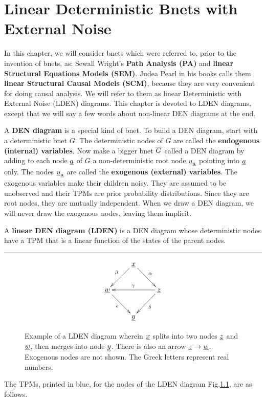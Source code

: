 \chapter{Linear Deterministic Bnets 
with External 
Noise}\label{ch-linear-sys}

In this chapter, we will consider 
bnets which were referred to,
prior to the invention of bnets, as:
Sewall Wright's {\bf Path Analysis (PA)}
 and
{\bf linear Structural Equations Models (SEM)}.
Judea Pearl in his
books calls them
{\bf linear Structural Causal Models (SCM)},
because they are very 
convenient for doing causal analysis.
We will refer  to
them as linear  Deterministic with 
External Noise
 (LDEN) diagrams.
This chapter
is devoted to LDEN diagrams,
except that we will
say a few words
about non-linear DEN
diagrams at the end.


A {\bf DEN diagram}
is a special kind of bnet.
To 
build a DEN diagram,
start with a 
deterministic bnet $G$.
The deterministic
nodes of $G$ are called
the {\bf endogenous (internal) variables}.
Now make a bigger bnet $\overline{G}$
called a DEN diagram
by 
adding to each node ${\underline{a}}$ of $G$ a
non-deterministic  
root node ${\underline{u}}_{\underline{a}}$
pointing into ${\underline{a}}$ only.
The nodes ${\underline{u}}_{\underline{a}}$ are called
the {\bf exogenous (external) variables}.
The exogenous
variables make their children noisy.
They are assumed 
to be unobserved
and their TPMs are prior
probability distributions.
Since they are 
root nodes, they are 
mutually independent.
When we
draw
a DEN diagram,
we will
never draw the exogenous nodes,
leaving them implicit.

A {\bf linear DEN diagram (LDEN)} is 
a DEN diagram
whose deterministic nodes
have a TPM that is a linear 
function of the states
of the parent nodes.


\hrule{}


\begin{figure}[h!]
$$\xymatrix{
&\rvx\ar[dl]_\beta\ar[dr]^\alp
\\
\rvw\ar[dr]_\epsilon&&\rvz\ar[ll]_\gamma\ar[dl]^\delta
\\
&\rvy
}$$
\caption{
Example of a LDEN diagram wherein
${\underline{x}}$ splits
into two nodes ${\underline{z}}$
and ${\underline{w}}$,
then merges into node ${\underline{y}}$.
There is also an arrow
${\underline{z}}\rightarrow {\underline{w}}$.
Exogenous
nodes are not shown.
The Greek letters
represent 
real numbers.
}
\label{fig-scm-diamond}
\end{figure}

The TPMs, printed in blue,
for the nodes of the LDEN diagram 
Fig.\ref{fig-scm-diamond},
are as follows.

